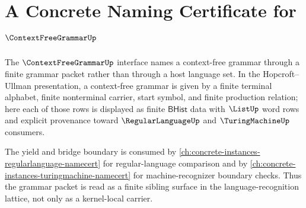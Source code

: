 \chapter{A Concrete Naming Certificate for $\ContextFreeGrammarUp$}
\label{ch:concrete-instances-contextfreegrammar-namecert}

The $\ContextFreeGrammarUp$ interface names a context-free grammar through a
finite grammar packet rather than through a host language set. In the
Hopcroft--Ullman presentation, a context-free grammar is given by a finite
terminal alphabet, finite nonterminal carrier, start symbol, and finite
production relation; here each of those rows is displayed as finite
$\mathsf{BHist}$ data with $\ListUp$ word rows and explicit provenance toward
$\RegularLanguageUp$ and $\TuringMachineUp$ consumers.

The yield and bridge boundary is consumed by \autoref{ch:concrete-instances-regularlanguage-namecert} for regular-language comparison and by \autoref{ch:concrete-instances-turingmachine-namecert} for machine-recognizer boundary checks. Thus the grammar packet is read as a finite sibling surface in the language-recognition lattice, not only as a kernel-local carrier.

